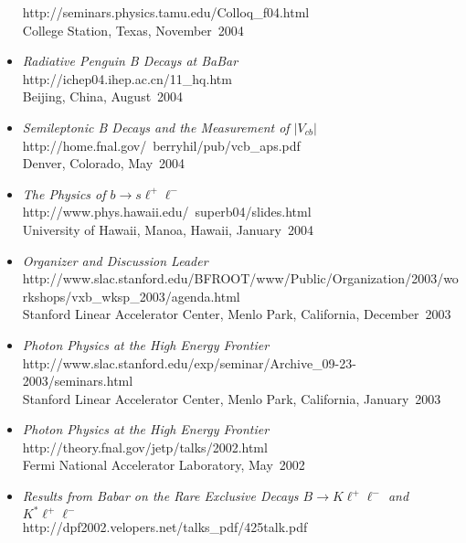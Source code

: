 \documentclass [12pt]{report}
\begin{document}
\begin{itemize}
{
{http://seminars.physics.tamu.edu/Colloq_f04.html}\\
College Station, Texas, November~2004}
\item{{\em Radiative Penguin B Decays at BaBar}\\ 
{http://ichep04.ihep.ac.cn/11_hq.htm}\\
Beijing, China, August~2004}
\item{{\em Semileptonic B Decays and the Measurement of $|V_{cb}|$}\\ 
{http://home.fnal.gov/~berryhil/pub/vcb_aps.pdf}\\
Denver, Colorado, May~2004}
\item{{\em The Physics of $b\rightarrow s \ell^+ \ell^-$}\\ 
{http://www.phys.hawaii.edu/~superb04/slides.html}\\
University of Hawaii, Manoa, Hawaii, January~2004}
\item{{\em Organizer and Discussion Leader}\\ 
{http://www.slac.stanford.edu/BFROOT/www/Public/Organization/2003/workshops/vxb_wksp_2003/agenda.html}\\
Stanford Linear Accelerator Center, Menlo Park, California, December~2003}
\item{{\em Photon Physics at the High Energy Frontier}\\ 
{http://www.slac.stanford.edu/exp/seminar/Archive_09-23-2003/seminars.html}\\
Stanford Linear Accelerator Center, Menlo Park, California, January~2003}
\item{{\em Photon Physics at the High Energy Frontier}\\ 
{http://theory.fnal.gov/jetp/talks/2002.html}\\
Fermi National Accelerator Laboratory, May~2002}
\item{{\em Results from Babar on the Rare Exclusive Decays 
$B\rightarrow K\ell^+\ell^-$ and $K^{*}\ell^+\ell^-$}\\ 
{http://dpf2002.velopers.net/talks_pdf/425talk.pdf}\\
}
\end{itemize}
\end{document}
